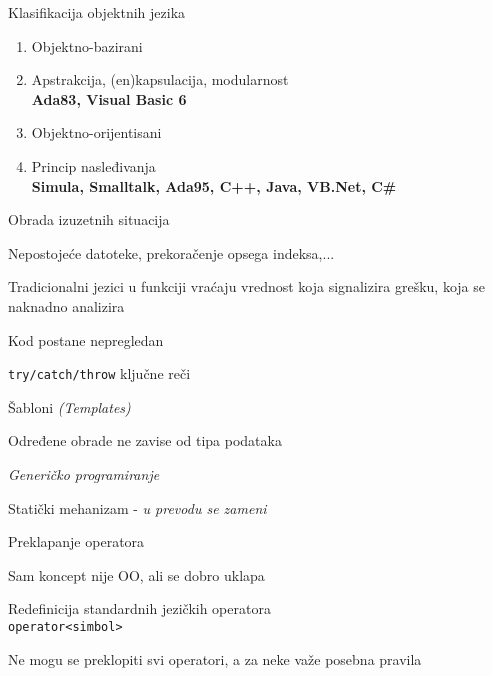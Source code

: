 \documentclass{article}
\newenvironment{xitemize}{%
    
    \itemize
    \larger
}{%
    \enditemize
}
\let\olditemize\itemize
\let\endolditemize\enditemize
\renewenvironment{itemize}{%
    \smaller
    \olditemize
}{%
    \endolditemize
}
\providecommand{\inlinecode}[1]{\texttt{#1}}
\begin{document}
\begin{xitemize}
    \item Klasifikacija objektnih jezika
    \begin{enumerate}
        \item Objektno-bazirani
       \begin{itemize}
           \item Apstrakcija, (en)kapsulacija, modularnost\\ \textbf{Ada83, Visual Basic 6}
       \end{itemize} 
       \item Objektno-orijentisani
       \begin{itemize}
           \item Princip nasleđivanja\\
           \textbf{Simula, Smalltalk, Ada95, C++, Java, VB.Net, C\#}
       \end{itemize}
    \end{enumerate}
    \item Obrada izuzetnih situacija
    \begin{itemize}
        \item Nepostojeće datoteke, prekoračenje opsega indeksa,...
        \item Tradicionalni jezici u funkciji vraćaju vrednost koja signalizira grešku, koja se naknadno analizira
        \item Kod postane nepregledan
        \item   \inlinecode{try/catch/throw} ključne reči
    \end{itemize}
    \item Šabloni \textit{(Templates)}
    \begin{itemize}
        \item Određene obrade ne zavise od tipa podataka
        \item \textit{Generičko programiranje}
        \item Statički mehanizam - \textit{u prevodu se zameni}
    \end{itemize}
    \item Preklapanje operatora
    \begin{itemize}
        \item Sam koncept nije OO, ali se dobro uklapa
        \item Redefinicija standardnih jezičkih operatora
        \\   \inlinecode{operator<simbol>}
        \item Ne mogu se preklopiti svi operatori, a za neke važe posebna pravila
    \end{itemize}
\end{xitemize}
\end{document}
